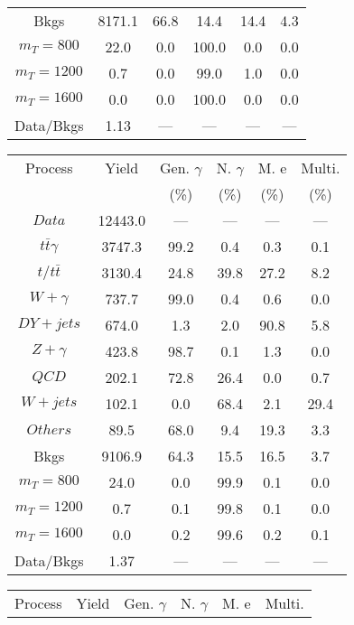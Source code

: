 \begin{figure}
\begin{minipage}[c]{0.32\textwidth}
{\begin{tabular}{cccccc}
Bkgs &  8171.1 &  66.8 &  14.4 &  14.4 &  4.3\\
$ m_{T} = 800 $ &  22.0 &  0.0 &  100.0 &  0.0 &  0.0\\
$ m_{T} = 1200 $ &  0.7 &  0.0 &  99.0 &  1.0 &  0.0\\
$ m_{T} = 1600 $ &  0.0 &  0.0 &  100.0 &  0.0 &  0.0\\
Data/Bkgs &  1.13 &  --- &  --- &  --- &  ---\\
\hline
\end{tabular}
}
\end{minipage}
\begin{minipage}[c]{0.32\textwidth}
\centering
\tiny{
\begin{tabular}{cccccc}
\hline
Process & Yield & Gen. $\gamma$ & N. $\gamma$ & M. e & Multi. \\
 &  & (\%) & (\%) & (\%) & (\%)  \\
\hline
                                                                      $ Data $ &  12443.0 &  --- &  --- &  --- &  ---\\
$ t\bar{t}\gamma $ &  3747.3 &  99.2 &  0.4 &  0.3 &  0.1\\
$ t/t\bar{t} $ &  3130.4 &  24.8 &  39.8 &  27.2 &  8.2\\
$ W+\gamma $ &  737.7 &  99.0 &  0.4 &  0.6 &  0.0\\
$ DY+jets $ &  674.0 &  1.3 &  2.0 &  90.8 &  5.8\\
$ Z+\gamma $ &  423.8 &  98.7 &  0.1 &  1.3 &  0.0\\
$ QCD $ &  202.1 &  72.8 &  26.4 &  0.0 &  0.7\\
$ W+jets $ &  102.1 &  0.0 &  68.4 &  2.1 &  29.4\\
$ Others $ &  89.5 &  68.0 &  9.4 &  19.3 &  3.3\\
Bkgs &  9106.9 &  64.3 &  15.5 &  16.5 &  3.7\\
$ m_{T} = 800 $ &  24.0 &  0.0 &  99.9 &  0.1 &  0.0\\
$ m_{T} = 1200 $ &  0.7 &  0.1 &  99.8 &  0.1 &  0.0\\
$ m_{T} = 1600 $ &  0.0 &  0.2 &  99.6 &  0.2 &  0.1\\
Data/Bkgs &  1.37 &  --- &  --- &  --- &  ---\\
\hline
\end{tabular}
}
\end{minipage}
\begin{minipage}[c]{0.32\textwidth}
\centering
\tiny{
\begin{tabular}{cccccc}
\hline
Process & Yield & Gen. $\gamma$ & N. $\gamma$ & M. e & Multi. \\

\end{tabular}}
\end{minipage}
\end{figure}

